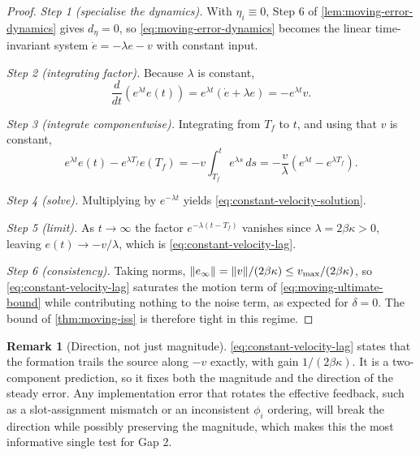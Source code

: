 \documentclass[11pt,a4paper]{article}
\theoremstyle{plain}
\theoremstyle{definition}
\newtheorem{remark}{Remark}
\DeclarePairedDelimiter{\norm}{\lVert}{\rVert}
\begin{document}
\begin{proof}
\emph{Step 1 (specialise the dynamics).} With $\eta_i\equiv0$, Step 6 of
\cref{lem:moving-error-dynamics} gives $d_\eta=0$, so \eqref{eq:moving-error-dynamics} becomes
the linear time-invariant system $\dot e=-\lambda e-v$ with constant input.

\emph{Step 2 (integrating factor).} Because $\lambda$ is constant,
\begin{equation*}
    \frac{d}{dt}\left(e^{\lambda t}e(t)\right)
    =e^{\lambda t}\left(\dot e+\lambda e\right)
    =-e^{\lambda t}v .
\end{equation*}

\emph{Step 3 (integrate componentwise).} Integrating from $T_f$ to $t$, and using that $v$ is
constant,
\begin{equation*}
    e^{\lambda t}e(t)-e^{\lambda T_f}e(T_f)
    =-v\int_{T_f}^te^{\lambda s}\,ds
    =-\frac{v}{\lambda}\left(e^{\lambda t}-e^{\lambda T_f}\right).
\end{equation*}

\emph{Step 4 (solve).} Multiplying by $e^{-\lambda t}$ yields
\eqref{eq:constant-velocity-solution}.

\emph{Step 5 (limit).} As $t\to\infty$ the factor $e^{-\lambda(t-T_f)}$ vanishes since
$\lambda=2\beta\kappa>0$, leaving $e(t)\to-v/\lambda$, which is
\eqref{eq:constant-velocity-lag}.

\emph{Step 6 (consistency).} Taking norms,
$\norm{e_\infty}=\norm{v}/(2\beta\kappa)\leq v_{\max}/(2\beta\kappa)$, so
\eqref{eq:constant-velocity-lag} saturates the motion term of
\eqref{eq:moving-ultimate-bound} while contributing nothing to the noise term, as expected for
$\delta=0$. The bound of \cref{thm:moving-iss} is therefore tight in this regime.
\end{proof}

\begin{remark}[Direction, not just magnitude]\label{rem:lag-direction}
\eqref{eq:constant-velocity-lag} states that the formation trails the source along
$-v$ exactly, with gain $1/(2\beta\kappa)$. It is a two-component prediction, so it fixes both
the magnitude and the direction of the steady error. Any implementation error that rotates the
effective feedback, such as a slot-assignment mismatch or an inconsistent $\phi_i$ ordering, will
break the direction while possibly preserving the magnitude, which makes this the most
informative single test for Gap 2.
\end{remark}
\end{document}
